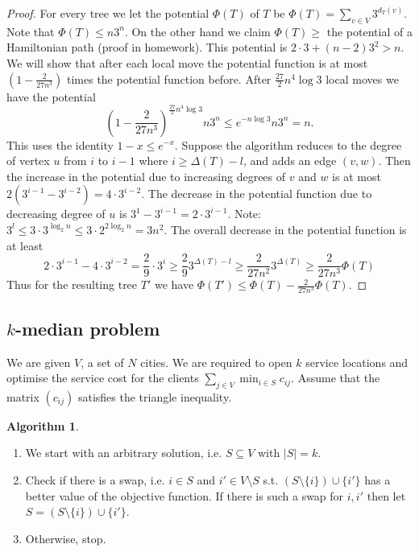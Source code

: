 \documentclass{article}
\theoremstyle{definition}
\newtheorem*{alg}{Algorithm}
\begin{document}
\begin{proof}
For every tree we let the potential $\Phi(T)$ of $T$ be $\Phi(T) = \sum_{v\in V} 3^{d_T(v)}$. \\
Note that $\Phi(T) \le n3^n$.
On the other hand we claim $\Phi(T) \ge$ the potential of a Hamiltonian path (proof in homework).
This potential is $2\cdot3 + (n-2)3^2> n$.
We will show that after each local move the potential function is at most $(1-\frac{2}{27n^3})$ times the potential function before.
After $\frac{27}{2}n^4\log3$ local moves we have the potential $$\left(1-\frac{2}{27n^3}\right)^{\frac{27}{2}n^4\log 3} n3^n \le e^{-n\log 3}n3^n = n.$$
This uses the identity $1-x \le e^{-x}$.
Suppose the algorithm reduces to the degree of vertex $u$ from $i$ to $i-1$ where $i\ge \Delta(T) - l$, and adds an edge $(v,w)$.
Then the increase in the potential due to increasing degrees of $v$ and $w$ is at most $2(3^{i-1} -3^{i-2}) = 4\cdot3^{i-2}$.
The decrease in the potential function due to decreasing degree of $u$ is $3^1 - 3^{i-1} = 2\cdot3^{i-1}$.
Note: $3^l \le 3\cdot 3^{\log_2 n}\le 3\cdot2^{2\log_2 n} = 3n^2$.
The overall decrease in the potential function is at least $$2\cdot 3^{i-1}-4\cdot 3^{i-2} = \frac{2}{9}\cdot 3^i\ge \frac{2}{9}3^{\Delta(T) - l}\ge \frac{2}{27n^2}3^{\Delta(T)} \ge \frac{2}{27n^3}\Phi(T)$$
Thus for the resulting tree $T'$ we have $\Phi(T') \le \Phi(T) - \frac{2}{27n^3}\Phi(T)$.
\end{proof}

\subsection{$k$-median problem}
We are given $V$, a set of $N$ cities.
We are required to open $k$ service locations and optimise the service cost for the clients $\sum_{j\in V} \min_{i\in S} c_{ij}$.
Assume that the matrix $(c_{ij})$ satisfies the triangle inequality.


\begin{alg}~
\begin{enumerate}
\item We start with an arbitrary solution, i.e. $S\subseteq V$ with $|S| = k$.
\item Check if there is a swap, i.e. $i\in S$ and $i'\in V\setminus S$ s.t. $(S\setminus\{i\})\cup\{i'\}$ has a better value of the objective function.
If there is such a swap for $i,i'$ then let $S=(S\setminus\{i\})\cup\{i'\}$.
\item Otherwise, stop.
\end{enumerate}
\end{alg}
\end{document}
